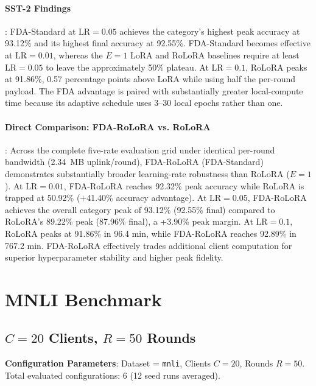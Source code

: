 \documentclass[10pt,a4paper]{article}
\begin{document}
\paragraph{SST-2 Findings}:
FDA-Standard at $\mathrm{LR}=0.05$ achieves the category's highest peak accuracy at 93.12\% and its highest final accuracy at 92.55\%.
FDA-Standard becomes effective at $\mathrm{LR}=0.01$, whereas the $E=1$ LoRA and RoLoRA baselines require at least $\mathrm{LR}=0.05$ to leave the approximately 50\% plateau.
At $\mathrm{LR}=0.1$, RoLoRA peaks at 91.86\%, 0.57 percentage points above LoRA while using half the per-round payload.
The FDA advantage is paired with substantially greater local-compute time because its adaptive schedule uses 3--30 local epochs rather than one.

\paragraph{Direct Comparison: FDA-RoLoRA vs. RoLoRA}:
Across the complete five-rate evaluation grid under identical per-round bandwidth (2.34~MB uplink/round), FDA-RoLoRA (FDA-Standard) demonstrates substantially broader learning-rate robustness than RoLoRA ($E=1$). At $\mathrm{LR}=0.01$, FDA-RoLoRA reaches 92.32\% peak accuracy while RoLoRA is trapped at 50.92\% (+41.40\% accuracy advantage). At $\mathrm{LR}=0.05$, FDA-RoLoRA achieves the overall category peak of 93.12\% (92.55\% final) compared to RoLoRA's 89.22\% peak (87.96\% final), a +3.90\% peak margin. At $\mathrm{LR}=0.1$, RoLoRA peaks at 91.86\% in 96.4 min, while FDA-RoLoRA reaches 92.89\% in 767.2 min. FDA-RoLoRA effectively trades additional client computation for superior hyperparameter stability and higher peak fidelity.

\clearpage
\section{MNLI Benchmark}
\subsection{\texorpdfstring{$C=20$ Clients, $R=50$ Rounds}{C=20 Clients, R=50 Rounds}}

\textbf{Configuration Parameters}: Dataset = \texttt{mnli}, Clients $C = 20$, Rounds $R = 50$. Total evaluated configurations: 6 (12 seed runs averaged).
\end{document}
